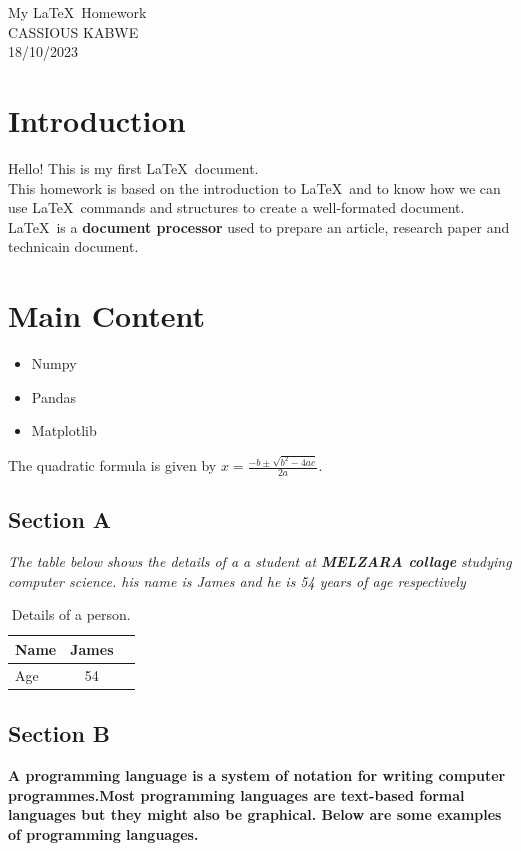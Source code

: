 \documentclass{article}
\begin{document}
\begin{titlepage}
  \begin{center}
    My \LaTeX\ Homework\\
   CASSIOUS KABWE\\
   18/10/2023
  \end{center}
  
 \end{titlepage}
 
 \section{Introduction}
 Hello! This is my first \LaTeX\ document.\\
 This homework is based on the introduction to \LaTeX\ and to know how we can use \LaTeX\ commands and structures to create a well-formated document.
\LaTeX\ is a \textbf{document processor} used to prepare an article, research paper and technicain document.\cite{Smith,J.(2000).A Sample Book}
 
 \section{Main Content}
 \begin{itemize}
    \item Numpy
    \item Pandas
    \item Matplotlib
 \end{itemize}

 The quadratic formula is given by $x=\frac{-b\pm\sqrt{b^2-4ac}}{2a}$.

\subsection{Section A}
\textit{The table below shows the details of a a student at \textbf{MELZARA collage} studying computer science.
his name is James and he is 54 years of age respectively}
\begin{table}[h]
   \caption{Details of a person.}
    \begin{tabular}{|l|c|r|}
        \hline
        Name&James\\ \hline
        Age&54\\ \hline
    \end{tabular}
 \end{table}

 
 \subsection{Section B}
\textbf{A programming language is a system of notation for writing computer programmes.Most programming languages are text-based formal languages but they might also be graphical. Below are some examples of programming languages.}
\end{document}
